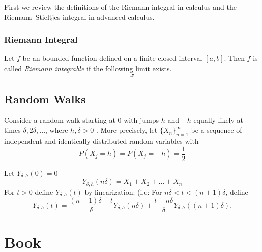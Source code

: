 \documentclass[
]{book}
\theoremstyle{definition}
\theoremstyle{definition}
\theoremstyle{definition}
\theoremstyle{definition}
\theoremstyle{remark}
\begin{document}
First we review the definitions of the Riemann integral in calculus and the Riemann--Stieltjes integral in advanced calculus.

\subsection{Riemann Integral}\label{riemann-integral}

Let \(f\) be an bounded function defined on a finite closed interval \([a, b]\). Then \(f\) is called \emph{Riemann integrable} if the following limit exists.
\begin{equation}
x
\end{equation}

\section{Random Walks}\label{random-walks}

Consider a random walk starting at 0 with jumps \(h\) and \(-h\) equally likely at times \(\delta, 2\delta,...\), where \(h,\delta>0\) . More precisely, let \(\{X_n\}_{n=1}^\infty\) be a sequence of independent and identically distributed random variables with
\[P(X_j = h) = P(X_j = −h) = \frac{1}{2}\]

Let \(Y_{\delta,h}(0) =0\)
\[Y_{\delta,h}(n\delta) = X_1 + X_2 + \ldots + X_n\]
For \(t > 0\) define \(Y_{\delta,h}(t)\) by linearization:
(i.e: For \(n\delta < t < (n + 1)\delta\), define
\[Y_{\delta,h}(t) = \frac{(n + 1)\delta - t}{\delta} Y_{\delta,h}(n\delta) + \frac{t - n\delta}{\delta} Y_{\delta,h}((n + 1)\delta).\]

\chapter{Book}\label{book}
\end{document}
